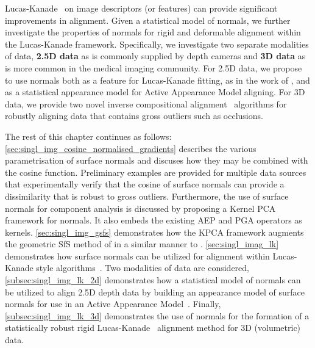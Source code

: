 Lucas-Kanade~\cite{lucas1981iterative} on image descriptors (or features) can
provide significant improvements in alignment. Given a statistical model
of normals, we further investigate the properties of normals for rigid and
deformable alignment within the Lucas-Kanade framework. Specifically, we
investigate two separate modalities of data, \textbf{2.5D data} as is
commonly supplied by depth cameras and \textbf{3D data} as is more common
in the medical imaging community. For 2.5D data, we propose to use normals both
as a feature for Lucas-Kanade fitting, as in the work of
\citet{antonakos2015feature}, and as a statistical appearance model for Active
Appearance Model aligning. For 3D data, we provide two novel inverse
compositional alignment~\cite{baker2004lucas} algorithms for robustly aligning
data that contains gross outliers such as occlusions.

The rest of this chapter continues as follows:
\cref{sec:singl_img_cosine_normalised_gradients} describes the various
parametrisation of surface normals and discuses how they may be combined with
the cosine function. Preliminary examples are provided for multiple
data sources that experimentally verify that the cosine of surface normals
can provide a dissimilarity that is robust to gross outliers. Furthermore,
the use of surface normals for component analysis is discussed by proposing a 
Kernel PCA framework for normals. It also embeds the existing AEP and PGA 
operators as kernels.
\cref{sec:singl_img_gsfs} demonstrates how the KPCA framework augments
the geometric SfS method of \citet{worthington1999new} in a similar manner to
\citet{smith2006recovering}. 
\cref{sec:singl_imag_lk} demonstrates how surface
normals can be utilized for alignment within Lucas-Kanade style
algorithms~\cite{lucas1981iterative}. Two modalities of data are considered,
\cref{subsec:singl_img_lk_2d} demonstrates how a statistical model of normals can be
utilized to align 2.5D depth data by building an appearance model of surface
normals for use in an Active Appearance Model~\cite{cootes2001active}. Finally,
\cref{subsec:singl_img_lk_3d} demonstrates the use of normals for the formation of
a statistically robust rigid Lucas-Kanade~\cite{lucas1981iterative} alignment
method for 3D (volumetric) data.
{





}
\stopcontents[chapters]
